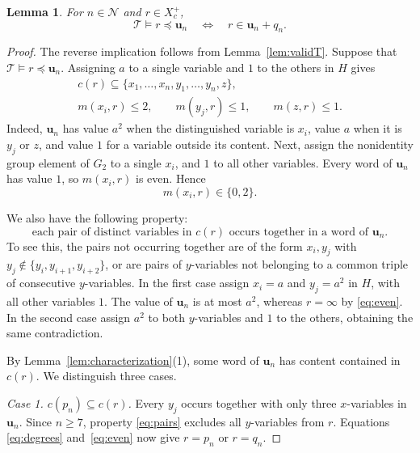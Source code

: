 \documentclass[10pt,a4paper]{amsart}
\newtheorem{lemma}[theorem]{Lemma}
\newcommand{\T}{\mathcal T}
\newcommand{\Ncal}{\mathcal N}
\newcommand{\bu}{\mathbf u}
\numberwithin{equation}{section}
\begin{document}
\begin{lemma}\label{lem:word}
For $n\in\Ncal$ and $r\in X_c^+$,
\[
\T\models r\preceq\bu_n
\quad\Longleftrightarrow\quad
r\in\bu_n+q_n.
\]
\end{lemma}
\begin{proof}
The reverse implication follows from Lemma~\ref{lem:validT}. Suppose that
$\T\models r\preceq\bu_n$. Assigning $a$ to a single variable and $1$
to the others in $H$ gives
\begin{equation}\label{eq:degrees}
\begin{gathered}
c(r)\subseteq\{x_1,\ldots,x_n,y_1,\ldots,y_n,z\},\\
m(x_i,r)\leq2,\qquad m(y_j,r)\leq1,\qquad m(z,r)\leq1.
\end{gathered}
\end{equation}
Indeed, $\bu_n$ has value $a^2$ when the distinguished variable is $x_i$,
value $a$ when it is $y_j$ or $z$, and value $1$ for a variable outside
its content. Next, assign the nonidentity group element of $G_2$ to a
single $x_i$, and $1$ to all other variables. Every word of $\bu_n$
has value $1$, so $m(x_i,r)$ is even. Hence
\begin{equation}\label{eq:even}
m(x_i,r)\in\{0,2\}.
\end{equation}

We also have the following property:
\begin{equation}\label{eq:pairs}
\text{each pair of distinct variables in $c(r)$ occurs together in a word of $\bu_n$.}
\end{equation}
To see this, the pairs not occurring together are of the form $x_i,y_j$
with $y_j\notin\{y_i,y_{i+1},y_{i+2}\}$, or are pairs of $y$-variables
not belonging to a common triple of consecutive $y$-variables. In the
first case assign $x_i=a$ and $y_j=a^2$ in $H$, with all other variables
$1$. The value of $\bu_n$ is at most $a^2$, whereas $r=\infty$ by
\eqref{eq:even}. In the second case assign $a^2$ to both $y$-variables
and $1$ to the others, obtaining the same contradiction.

By Lemma~\ref{lem:characterization}(1), some word of $\bu_n$ has content
contained in $c(r)$. We distinguish three cases.

\emph{Case 1. $c(p_n)\subseteq c(r)$.} Every $y_j$ occurs together with
only three $x$-variables in $\bu_n$. Since $n\geq7$, property
\eqref{eq:pairs} excludes all $y$-variables from $r$. Equations
\eqref{eq:degrees} and~\eqref{eq:even} now give $r=p_n$ or $r=q_n$.


\end{proof}
\end{document}
